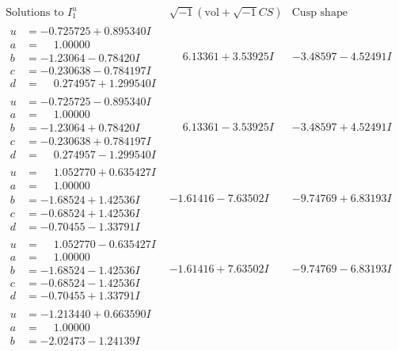 \documentclass[1p]{elsarticle_modified}
\theoremstyle{definition}
\newcommand{\I}{\sqrt{-1}}
\begin{document}
$$\begin{array}{c|c|c}  
\text{Solutions to }I^u_{1}& \I (\text{vol} + \sqrt{-1}CS) & \text{Cusp shape}\\
 \hline 
\begin{aligned}
u &= -0.725725 + 0.895340 I \\
a &= \phantom{-}1.00000\phantom{ +0.000000I} \\
b &= -1.23064 - 0.78420 I \\
c &= -0.230638 - 0.784197 I \\
d &= \phantom{-}0.274957 + 1.299540 I\end{aligned}
 & \phantom{-}6.13361 + 3.53925 I & -3.48597 - 4.52491 I \\ \hline\begin{aligned}
u &= -0.725725 - 0.895340 I \\
a &= \phantom{-}1.00000\phantom{ +0.000000I} \\
b &= -1.23064 + 0.78420 I \\
c &= -0.230638 + 0.784197 I \\
d &= \phantom{-}0.274957 - 1.299540 I\end{aligned}
 & \phantom{-}6.13361 - 3.53925 I & -3.48597 + 4.52491 I \\ \hline\begin{aligned}
u &= \phantom{-}1.052770 + 0.635427 I \\
a &= \phantom{-}1.00000\phantom{ +0.000000I} \\
b &= -1.68524 + 1.42536 I \\
c &= -0.68524 + 1.42536 I \\
d &= -0.70455 - 1.33791 I\end{aligned}
 & -1.61416 - 7.63502 I & -9.74769 + 6.83193 I \\ \hline\begin{aligned}
u &= \phantom{-}1.052770 - 0.635427 I \\
a &= \phantom{-}1.00000\phantom{ +0.000000I} \\
b &= -1.68524 - 1.42536 I \\
c &= -0.68524 - 1.42536 I \\
d &= -0.70455 + 1.33791 I\end{aligned}
 & -1.61416 + 7.63502 I & -9.74769 - 6.83193 I \\ \hline\begin{aligned}
u &= -1.213440 + 0.663590 I \\
a &= \phantom{-}1.00000\phantom{ +0.000000I} \\
b &= -2.02473 - 1.24139 I \\

\end{aligned}
\end{array}$$
\end{document}
